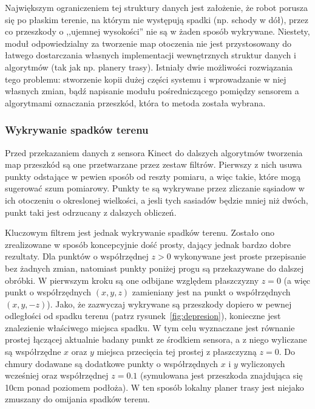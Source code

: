 Największym ograniczeniem tej struktury danych jest założenie, że robot porusza
się po płaskim terenie, na którym nie występują spadki (np. schody w dół), przez
co przeszkody o ,,ujemnej wysokości'' nie są w żaden sposób wykrywane. Niestety,
moduł odpowiedzialny za tworzenie map otoczenia nie jest przystosowany do
łatwego dostarczania własnych implementacji wewnętrznych struktur danych i
algorytmów (tak jak np. planery trasy). Istniały dwie możliwości
rozwiązania tego problemu: stworzenie kopii dużej części systemu i wprowadzanie
w niej własnych zmian, bądź napisanie modułu pośredniczącego pomiędzy sensorem a
algorytmami oznaczania przeszkód, która to metoda została wybrana.

\subsubsection{Wykrywanie spadków terenu}

Przed przekazaniem danych z sensora Kinect do dalszych algorytmów tworzenia map
przeszkód są one przetwarzane przez zestaw filtrów. Pierwszy z nich usuwa punkty
odstające w pewien sposób od reszty pomiaru, a więc takie, które mogą sugerować
szum pomiarowy. Punkty te są wykrywane przez zliczanie sąsiadow w ich otoczeniu
o okreslonej wielkości, a jesli tych sasiadów będzie mniej niż dwóch, punkt taki
jest odrzucany z dalszych obliczeń.

Kluczowym filtrem jest jednak wykrywanie spadków terenu. Zostało ono zrealizowane
w sposób koncepcyjnie dość prosty, dający jednak bardzo dobre rezultaty. Dla punktów
o współrzędnej $z>0$ wykonywane
jest proste przepisanie bez żadnych zmian, natomiast punkty poniżej progu są przekazywane
do dalszej obróbki. W pierwszym kroku są one odbijane względem płaszczyzny $z=0$
(a więc punkt o współrzędnych $(x, y, z)$ zamieniany jest na punkt o współrzędnych
$(x, y, -z)$). Jako, że zazwyczaj wykrywane są przeszkody dopiero w pewnej
odległości od spadku terenu (patrz rysunek~\ref{fig:depresion}), konieczne jest
znalezienie właściwego miejsca spadku. W tym celu wyznaczane jest równanie prostej
łączącej aktualnie badany punkt ze środkiem sensora, a z niego wyliczane są współrzędne
$x$ oraz $y$ miejsca przecięcia tej prostej z płaszczyzną $z=0$. Do chmury dodawane
są dodatkowe punkty o współrzędnych $x$ i $y$ wyliczonych wcześniej oraz współrzędnej
$z=0.1$ (symulowana jest przeszkoda znajdująca się 10cm ponad poziomem podłoża).
W ten sposób lokalny planer trasy jest niejako zmuszany do omijania spadków terenu.

